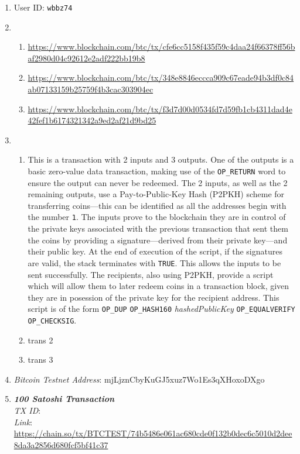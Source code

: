 \documentclass[11pt]{article}
\begin{document}
\begin{enumerate}
\item User ID: \texttt{wbbz74}
\item 
\begin{enumerate}
\item \url{https://www.blockchain.com/btc/tx/cfe6cc5158f435f59c4daa24f66378ff56baf2980d04c92612e2adf222bb19b8}
\item \url{https://www.blockchain.com/btc/tx/348e8846eccca909c67eade94b3df0c84ab07133159b25759f4b3cac303904ec}
\item \url{https://www.blockchain.com/btc/tx/f3d7d00d0534fd7d59fb1cb4311dad4e42fef1b6174321342a9ed2af21d9bd25}
\end{enumerate}
\item 
\begin{enumerate}
\item This is a transaction with 2 inputs and 3 outputs. One of the outputs is a basic zero-value data transaction, making use of the \texttt{OP\_RETURN} word to ensure the output can never be redeemed. The 2 inputs, as well as the 2 remaining outputs, use a Pay-to-Public-Key Hash (P2PKH) scheme for transferring coins---this can be identified as all the addresses begin with the number \texttt{1}. The inputs prove to the blockchain they are in control of the private keys associated with the previous transaction that sent them the coins by providing a signature---derived from their private key---and their public key. At the end of execution of the script, if the signatures are valid, the stack terminates with \texttt{TRUE}. This allows the inputs to be sent successfully. The recipients, also using P2PKH, provide a script which will allow them to later redeem coins in a transaction block, given they are in posession of the private key for the recipient address. This script is of the form \texttt{OP\_DUP} \texttt{OP\_HASH160} \textit{hashedPublicKey} \texttt{OP\_EQUALVERIFY} \texttt{OP\_CHECKSIG}.
\item trans 2
\item trans 3
\end{enumerate}

\item \textit{Bitcoin Testnet Address}: mjLjznCbyKuGJ5xuz7Wo1Es3qXHoxoDXgo

\item \textbf{\textit{100 Satoshi Transaction}}\\
\textit{TX ID}: \texttt{}\\
\textit{Link}: \url{https://chain.so/tx/BTCTEST/74b5486e061ac680cde0f132b0dec6c5010d2dee8da3a2856d680fcf5bf41c37}


\end{enumerate}
\end{document}
